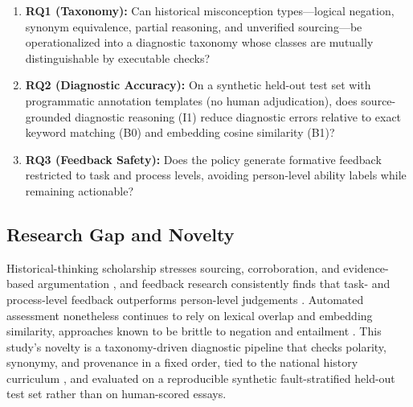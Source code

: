 \documentclass[11pt,a4paper]{article}
\begin{document}
\begin{enumerate}[label=\textbf{RQ\arabic*}, leftmargin=2.4em]
    \item \textbf{RQ1 (Taxonomy):} Can historical misconception types---logical negation, synonym equivalence, partial reasoning, and unverified sourcing---be operationalized into a diagnostic taxonomy whose classes are mutually distinguishable by executable checks?
    \item \textbf{RQ2 (Diagnostic Accuracy):} On a synthetic held-out test set with programmatic annotation templates (no human adjudication), does source-grounded diagnostic reasoning (I1) reduce diagnostic errors relative to exact keyword matching (B0) and embedding cosine similarity (B1)?
    \item \textbf{RQ3 (Feedback Safety):} Does the policy generate formative feedback restricted to task and process levels, avoiding person-level ability labels while remaining actionable?
\end{enumerate}

\subsection{Research Gap and Novelty}

Historical-thinking scholarship stresses sourcing, corroboration, and evidence-based argumentation \cite{wineburg2001historical, van2008historical, seixas2013big}, and feedback research consistently finds that task- and process-level feedback outperforms person-level judgements \cite{shute2008focus, hattie2007power}. Automated assessment nonetheless continues to rely on lexical overlap and embedding similarity, approaches known to be brittle to negation and entailment \cite{jurafsky2023speech}. This study's novelty is a taxonomy-driven diagnostic pipeline that checks polarity, synonymy, and provenance in a fixed order, tied to the national history curriculum \cite{moet2018gdpt}, and evaluated on a reproducible synthetic fault-stratified held-out test set rather than on human-scored essays.
\end{document}
